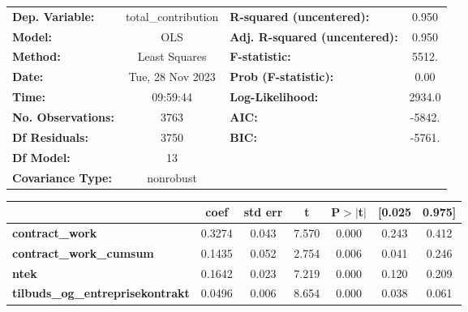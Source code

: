\begin{center}
\begin{tabular}{lclc}
\toprule
\textbf{Dep. Variable:}                  & total\_contribution & \textbf{  R-squared (uncentered):}      &     0.950   \\
\textbf{Model:}                          &         OLS         & \textbf{  Adj. R-squared (uncentered):} &     0.950   \\
\textbf{Method:}                         &    Least Squares    & \textbf{  F-statistic:       }          &     5512.   \\
\textbf{Date:}                           &   Tue, 28 Nov 2023  & \textbf{  Prob (F-statistic):}          &     0.00    \\
\textbf{Time:}                           &       09:59:44      & \textbf{  Log-Likelihood:    }          &    2934.0   \\
\textbf{No. Observations:}               &          3763       & \textbf{  AIC:               }          &    -5842.   \\
\textbf{Df Residuals:}                   &          3750       & \textbf{  BIC:               }          &    -5761.   \\
\textbf{Df Model:}                       &            13       & \textbf{                     }          &             \\
\textbf{Covariance Type:}                &      nonrobust      & \textbf{                     }          &             \\
\bottomrule
\end{tabular}
\begin{tabular}{lcccccc}
                                         & \textbf{coef} & \textbf{std err} & \textbf{t} & \textbf{P$> |$t$|$} & \textbf{[0.025} & \textbf{0.975]}  \\
\midrule
\textbf{contract\_work}                  &       0.3274  &        0.043     &     7.570  &         0.000        &        0.243    &        0.412     \\
\textbf{contract\_work\_cumsum}          &       0.1435  &        0.052     &     2.754  &         0.006        &        0.041    &        0.246     \\
\textbf{ntek}                            &       0.1642  &        0.023     &     7.219  &         0.000        &        0.120    &        0.209     \\
\textbf{tilbuds\_og\_entreprisekontrakt} &       0.0496  &        0.006     &     8.654  &         0.000        &        0.038    &        0.061     \\

\end{tabular}
\end{center}
